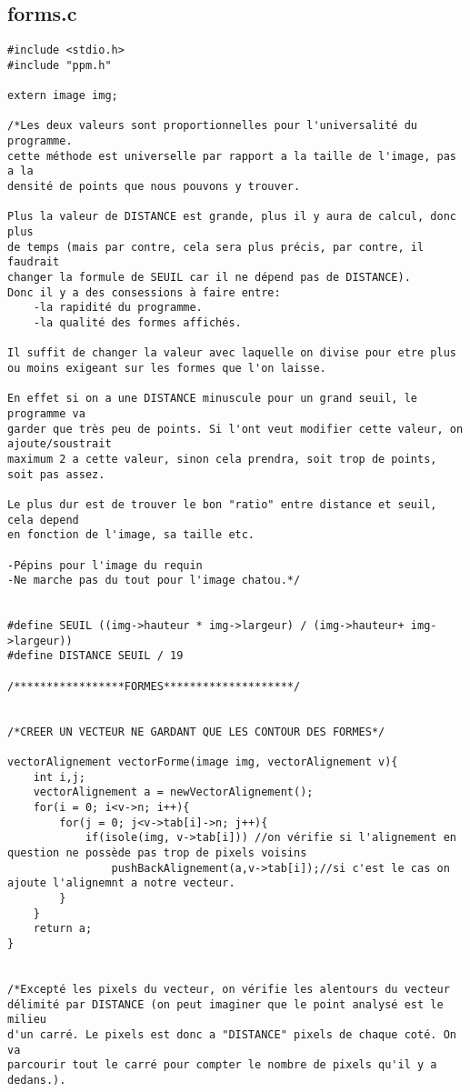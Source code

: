 \documentclass[a4paper , 10pt]{article}
\begin{document}
\subsection{forms.c}
\begin{verbatim}
#include <stdio.h>
#include "ppm.h"

extern image img;

/*Les deux valeurs sont proportionnelles pour l'universalité du programme.
cette méthode est universelle par rapport a la taille de l'image, pas a la
densité de points que nous pouvons y trouver.

Plus la valeur de DISTANCE est grande, plus il y aura de calcul, donc plus 
de temps (mais par contre, cela sera plus précis, par contre, il faudrait 
changer la formule de SEUIL car il ne dépend pas de DISTANCE).	
Donc il y a des consessions à faire entre:
	-la rapidité du programme.
	-la qualité des formes affichés.

Il suffit de changer la valeur avec laquelle on divise pour etre plus 
ou moins exigeant sur les formes que l'on laisse.

En effet si on a une DISTANCE minuscule pour un grand seuil, le programme va
garder que très peu de points. Si l'ont veut modifier cette valeur, on ajoute/soustrait
maximum 2 a cette valeur, sinon cela prendra, soit trop de points, soit pas assez.

Le plus dur est de trouver le bon "ratio" entre distance et seuil, cela depend 
en fonction de l'image, sa taille etc.

-Pépins pour l'image du requin
-Ne marche pas du tout pour l'image chatou.*/


#define SEUIL ((img->hauteur * img->largeur) / (img->hauteur+ img->largeur))
#define DISTANCE SEUIL / 19 

/*****************FORMES********************/


/*CREER UN VECTEUR NE GARDANT QUE LES CONTOUR DES FORMES*/

vectorAlignement vectorForme(image img, vectorAlignement v){
	int i,j;
	vectorAlignement a = newVectorAlignement();
	for(i = 0; i<v->n; i++){
		for(j = 0; j<v->tab[i]->n; j++){
			if(isole(img, v->tab[i])) //on vérifie si l'alignement en question ne possède pas trop de pixels voisins
				pushBackAlignement(a,v->tab[i]);//si c'est le cas on ajoute l'alignemnt a notre vecteur.
		}
	}
	return a;
}


/*Excepté les pixels du vecteur, on vérifie les alentours du vecteur
délimité par DISTANCE (on peut imaginer que le point analysé est le milieu
d'un carré. Le pixels est donc a "DISTANCE" pixels de chaque coté. On va
parcourir tout le carré pour compter le nombre de pixels qu'il y a dedans.).


\end{verbatim}
\end{document}
